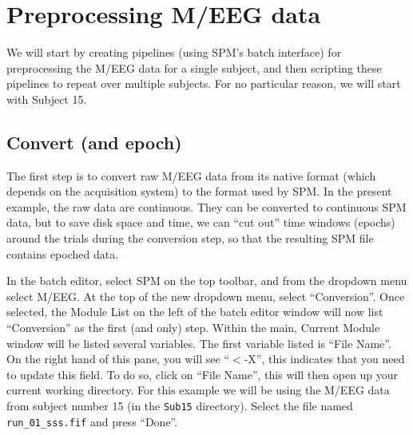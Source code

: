 \section{Preprocessing M/EEG data}

We will start by creating pipelines (using SPM's batch interface) for preprocessing the M/EEG data for a single subject, and then scripting these pipelines to repeat over multiple subjects. For no particular reason, we will start with Subject 15.

\subsection{Convert (and epoch)}

The first step is to convert raw M/EEG data from its native format (which depends on the acquisition system) to the format used by SPM.  In the present example, the raw data are continuous. They can be converted to continuous SPM data, but to save disk space and time, we can ``cut out'' time windows (epochs) around the trials during the conversion step, so that the resulting SPM file contains epoched data.

In the batch editor, select SPM on the top toolbar, and from the dropdown menu select M/EEG. At the top of the new dropdown menu, select ``Conversion''. Once selected, the Module List on the left of the batch editor window will now list ``Conversion'' as the first (and only) step. Within the main, Current Module window will be listed several variables. The first variable listed is ``File Name''. On the right hand of this pane, you will see ``\(<\)-X'', this indicates that you need to update this field. To do so, click on ``File Name'', this will then open up your current working directory. For this example we will be using the M/EEG data from subject number 15 (in the \texttt{Sub15} directory). Select the file named \texttt{run\_01\_sss.fif} and press ``Done''.

